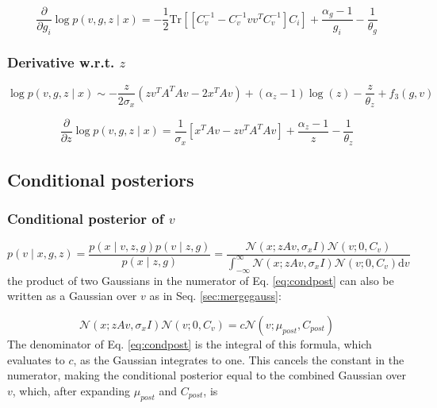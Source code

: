 \documentclass{paper}
\begin{document}
\begin{equation}
\frac{\partial}{\partial g_i} \log p(v,g,z \mid x) =  - \frac{1}{2} \textrm{Tr} \left[ \left[ C_v^{-1} - C_v^{-1} v v^T C_v^{-1} \right] C_i \right]  + \frac{\alpha_g - 1}{g_i} - \frac{1}{\theta_g}
\end{equation}


\subsubsection{Derivative w.r.t. $z$}

\begin{equation}
\log p(v,g,z \mid x) \sim - \frac{z}{2 \sigma_x} \left( zv^TA^TAv - 2x^TAv \right) + (\alpha_z - 1) \log(z) - \frac{z}{\theta_z} + f_3(g,v)
\end{equation}

\begin{equation}
\frac{\partial}{\partial z} \log p(v,g,z \mid x) =  \frac{1}{\sigma_x} \left[ x^TAv - z v^T A^TA v \right] + \frac{\alpha_z - 1}{z} - \frac{1}{\theta_z}
\end{equation}

\subsection{Conditional posteriors}

\subsubsection{Conditional posterior of $v$}

\begin{equation} \label{eq:condpost}
p(v \mid x,g,z) = \frac{p(x \mid v,z,g) p(v \mid z,g)}{p(x \mid z,g)} = \frac{\mathcal{N}(x;zAv,\sigma_x I) \mathcal{N}(v;0,C_v)}{\int_{-\infty}^{\infty} \mathcal{N}(x;zAv,\sigma_x I) \mathcal{N}(v;0,C_v) \mathrm{d}v}
\end{equation}
%
the product of two Gaussians in the numerator of Eq. \ref{eq:condpost} can also be written as a Gaussian over $v$ as in Seq. \ref{sec:mergegauss}:

\begin{equation} \label{eq:gauss_rewrite2}
\mathcal{N}(x;zAv,\sigma_x I) \mathcal{N}(v;0,C_v) = c \mathcal{N}(v; \mu_{post},C_{post})
\end{equation}
%
The denominator of Eq. \ref{eq:condpost} is the integral of this formula, which evaluates to $c$, as the Gaussian integrates to one. This cancels the constant in the numerator, making the conditional posterior equal to the combined Gaussian over $v$, which, after expanding $\mu_{post}$ and $C_{post}$, is
\end{document}

